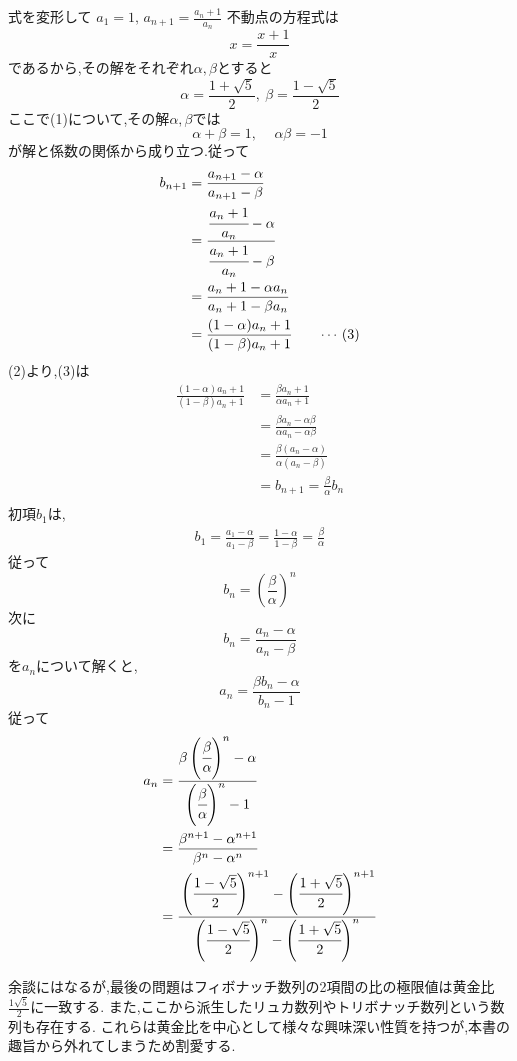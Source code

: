 \begin{enumerate}[label=(\arabic*),parsep=3pt,format=\bookitemlink{example-fractional-2}{solution}{problem}]
            式を変形して
            $\displaystyle a_1=1,\, a_{n+1}=\frac{a_n+1}{a_n}$
            不動点の方程式は
            \[
              x=\frac{x+1}{x}\tag*{\(\cdots\) (1)}
            \]
            であるから,その解をそれぞれ$\alpha,\beta$とすると
            \[
              \alpha=\frac{1+\sqrt{5}}{2},\ \beta=\frac{1-\sqrt{5}}{2}
            \]
            ここで(1)について,その解$\alpha,\beta$では
            \[
              \alpha+\beta=1,\, \quad \alpha\beta=-1\tag*{\(\cdots\) (2)}
            \]
            が解と係数の関係から成り立つ.従って
            \begin{align*}
              b_{n+1}&=\frac{a_{n+1}-\alpha}{a_{n+1}-\beta}\\
              &=\cfrac{\cfrac{a_n+1}{a_n}-\alpha}{\cfrac{a_n+1}{a_n}-\beta}\\
              &=\frac{a_n+1-\alpha a_n}{a_n+1-\beta a_n}\\
              &=\frac{(1-\alpha)a_n+1}{(1-\beta)a_n+1}\tag*{\(\cdots\) (3)}
            \end{align*}
            (2)より,(3)は
            \begin{align*}
              \frac{(1-\alpha)a_n+1}{(1-\beta)a_n+1}&=\frac{\beta a_n+1}{\alpha a_n+1}\\
              &=\frac{\beta a_n-\alpha\beta}{\alpha a_n-\alpha\beta}\\
              &=\frac{\beta (a_n-\alpha)}{\alpha (a_n-\beta)}\\
              &=b_{n+1}=\frac{\beta}{\alpha}b_n\\
            \end{align*}
            初項$b_1$は,
            \begin{align*}
              b_1=\frac{a_1-\alpha}{a_1-\beta}=\frac{1-\alpha}{1-\beta}=\frac{\beta}{\alpha}
            \end{align*}
            従って
            \[
              b_n=\left(\frac{\beta}{\alpha}\right)^n
            \]
            次に
            \[
              b_{n}=\frac{a_{n}-\alpha}{a_{n}-\beta}
            \]
            を$a_n$について解くと,
            \[
              a_{n}=\frac{\beta b_{n}-\alpha}{b_{n}-1}
            \]
            従って
            \begin{align*}
              a_{n}&=\cfrac{\beta \left(\cfrac{\beta}{\alpha}\right)^n-\alpha}{\left(\cfrac{\beta}{\alpha}\right)^n-1}  \\
              &=\frac{\beta^{n+1}-\alpha^{n+1}}{\beta^n-\alpha^n}\\
              &=\cfrac{\left(\cfrac{1-\sqrt{5}}{2}\right)^{n+1}-\left(\cfrac{1+\sqrt{5}}{2}\right)^{n+1}}{\left(\cfrac{1-\sqrt{5}}{2}\right)^n-\left(\cfrac{1+\sqrt{5}}{2}\right)^n}
            \end{align*}        
    \end{enumerate}
  余談にはなるが,最後の問題はフィボナッチ数列の2項間の比の極限値は黄金比$\frac{1\sqrt{5}}{2}$に一致する.
  また,ここから派生したリュカ数列やトリボナッチ数列という数列も存在する.
  これらは黄金比を中心として様々な興味深い性質を持つが,本書の趣旨から外れてしまうため割愛する.

